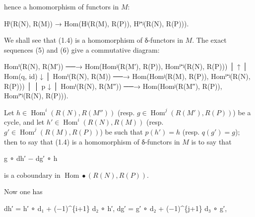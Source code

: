 \documentclass[
  11pt,
  a4paper,
]{book}
\newenvironment{Shaded}{}{}
\newcommand{\NormalTok}[1]{#1}
\begin{document}
hence a homomorphism of functors in \(M\):

\begin{Shaded}
\begin{Highlighting}[]
\NormalTok{Hⁱ(R(N), R(M)) → Hom(Hʲ(R(M), R(P)), Hⁱ⁺ʲ(R(N), R(P))).}
\end{Highlighting}
\end{Shaded}

We shall see that (1.4) is a homomorphism of δ-functors in \(M\). The
exact sequences (5) and (6) give a commutative diagram:

\begin{Shaded}
\begin{Highlighting}[]
\NormalTok{Homⁱ(R(N), R(M′))   ──→   Hom(Homʲ(R(M′), R(P)), Homⁱ⁺ʲ(R(N), R(P)))}
\NormalTok{       │                                       ↑}
\NormalTok{       │                                  Hom(q, id)}
\NormalTok{       ↓                                       │}
\NormalTok{Homⁱ(R(N), R(M))    ──→   Hom(Homʲ(R(M), R(P)), Homⁱ⁺ʲ(R(N), R(P)))}
\NormalTok{       │}
\NormalTok{       │ p}
\NormalTok{       ↓                                       │}
\NormalTok{Homⁱ(R(N), R(M″))   ──→   Hom(Homʲ(R(M″), R(P)), Homⁱ⁺ʲ(R(N), R(P))).}
\end{Highlighting}
\end{Shaded}

Let \(h \in \operatorname{Hom}^{i}(R(N), R(M''))\) (resp.
\(g \in \operatorname{Hom}^{j}(R(M'), R(P))\)) be a cycle, and let
\(h' \in \operatorname{Hom}^{i}(R(N), R(M))\) (resp.
\(g' \in \operatorname{Hom}^{j}(R(M), R(P))\)) be such that
\(p(h') = h\) (resp. \(q(g') = g\)); then to say that (1.4) is a
homomorphism of δ-functors in \(M\) is to say that

\begin{Shaded}
\begin{Highlighting}[]
\NormalTok{g ∘ dh′ − dg′ ∘ h}
\end{Highlighting}
\end{Shaded}

is a coboundary in \(\operatorname{Hom}\bullet(R(N), R(P))\).

Now one has

\begin{Shaded}
\begin{Highlighting}[]
\NormalTok{dh′ = h′ ∘ d₁ + (−1)\^{}\{i+1\} d₂ ∘ h′,}
\NormalTok{dg′ = g′ ∘ d₂ + (−1)\^{}\{j+1\} d₃ ∘ g′,}
\end{Highlighting}
\end{Shaded}
\end{document}
